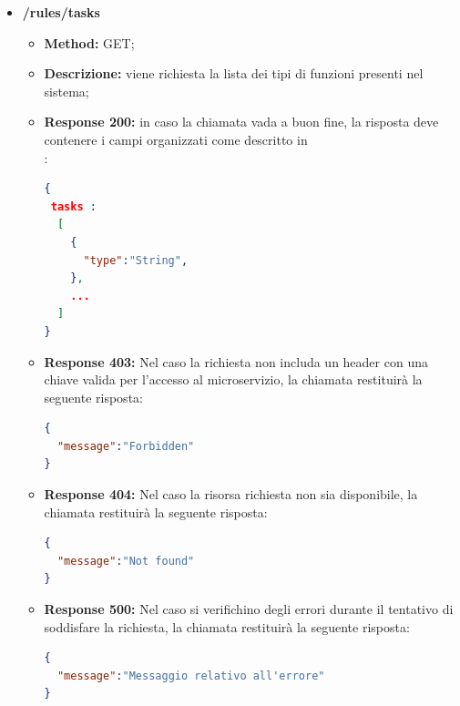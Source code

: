\begin{itemize}
\begin{itemize}
\item \textbf{Response 200:} Nel caso la richiesta vada a buon fine, la chiamata restituirà la seguente risposta:
\begin{lstlisting}[language=json,firstnumber=1]
{
  "message":"success"
}
\end{lstlisting}
\item \textbf{Response 404:} Nel caso la richiesta fatta non rispetti il formato sopra descritto, la chiamata restituirà la seguente risposta:
\begin{lstlisting}[language=json,firstnumber=1]
{
  "message":"Not found"
}
\end{lstlisting}
\item \textbf{Response 500:} Nel caso si verifichino degli errori durante il tentativo di soddisfare la richiesta, la chiamata restituirà la seguente risposta:
\begin{lstlisting}[language=json,firstnumber=1]
{
  "message":"Messaggio relativo all'errore"
}
\end{lstlisting}\end{itemize}


\item \textbf{/rules/tasks}\\

\begin{itemize}
\item \textbf{Method:} GET;
\item \textbf{Descrizione:} viene richiesta la lista dei tipi di funzioni presenti nel sistema;
\item \textbf{Response 200:} in caso la chiamata vada a buon fine, la risposta deve contenere i campi organizzati come descritto in \\:
\begin{lstlisting}[language=json,firstnumber=1]
{
 tasks :
  [
    {
      "type":"String",
    },
    ...
  ]
}
\end{lstlisting}
\item \textbf{Response 403:} Nel caso la richiesta non includa un header  con una chiave valida per l'accesso al microservizio, la chiamata restituirà la seguente risposta:
\begin{lstlisting}[language=json,firstnumber=1]
{
  "message":"Forbidden"
}
\end{lstlisting}

\item \textbf{Response 404:} Nel caso la risorsa richiesta non sia disponibile, la chiamata restituirà la seguente risposta:
\begin{lstlisting}[language=json,firstnumber=1]
{
  "message":"Not found"
}
\end{lstlisting}
\item \textbf{Response 500:} Nel caso si verifichino degli errori durante il tentativo di soddisfare la richiesta, la chiamata restituirà la seguente risposta:
\begin{lstlisting}[language=json,firstnumber=1]
{
  "message":"Messaggio relativo all'errore"
}
\end{lstlisting}
\end{itemize}

\end{itemize}
\newpage
